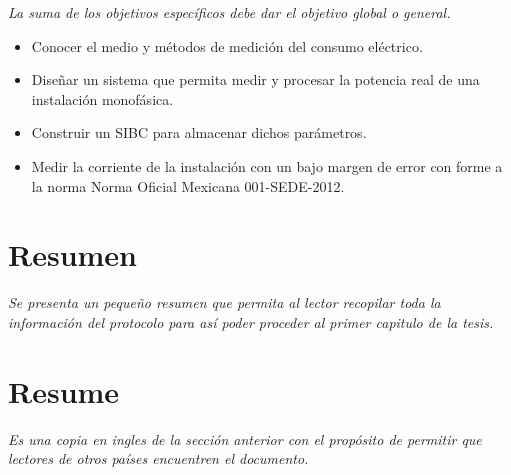 \textit{La suma de los objetivos específicos debe dar el objetivo global o general.}

\begin{itemize}

	\item Conocer el medio y métodos de medición del consumo eléctrico.
	\item Diseñar un sistema que permita medir y procesar la potencia real de una instalación monofásica.
	\item Construir un \gls{SIBC} para almacenar dichos parámetros. 
	\item Medir la corriente de la instalación con un bajo margen de error con forme a la norma Norma Oficial Mexicana 001-SEDE-2012. 

\end{itemize}
  

\section*{Resumen} 

\textit{Se presenta un pequeño resumen que permita al lector recopilar toda la información del protocolo para así poder proceder al primer capitulo de la tesis. }

\section*{Resume} %

\textit{Es una copia en ingles de la sección anterior con el propósito de permitir que lectores de otros países encuentren el documento.}

\newpage